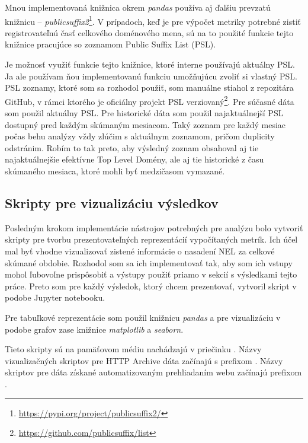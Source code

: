 Mnou implementovaná knižnica  okrem \textit{pandas} používa aj ďalšiu prevzatú knižnicu -- \textit{publicsuffix2}\footnote{\href{https://pypi.org/project/publicsuffix2/}{https://pypi.org/project/publicsuffix2/}}.
V prípadoch, keď je pre výpočet metriky potrebné zistiť registrovateľnú časť celkového doménového mena,
sú na to použité funkcie tejto knižnice pracujúce so zoznamom Public Suffix List (PSL).

Je možnosť využiť funkcie tejto knižnice, ktoré interne používajú aktuálny PSL.
Ja ale používam ňou implementovanú funkciu umožňujúcu zvoliť si vlastný PSL.
PSL zoznamy, ktoré som sa rozhodol použiť, som manuálne stiahol z repozitára GitHub, v rámci ktorého je oficiálny projekt PSL verziovaný\footnote{\href{https://github.com/publicsuffix/list}{https://github.com/publicsuffix/list}}. 
Pre súčasné dáta som použil aktuálny PSL.
Pre historické dáta som použil najaktuálnejší PSL dostupný pred každým skúmaným mesiacom.
Taký zoznam pre každý mesiac počas behu analýzy vždy zlúčim s aktuálnym zoznamom, pričom duplicity odstránim.
Robím to tak preto, aby výsledný zoznam obsahoval aj tie najaktuálnejšie efektívne Top Level Domény, ale aj tie historické z času skúmaného mesiaca, ktoré mohli byť medzičasom vymazané.


\subsection{Skripty pre vizualizáciu výsledkov}

Posledným krokom implementácie nástrojov potrebných pre analýzu bolo vytvoriť skripty pre tvorbu prezentovateľných reprezentácií vypočítaných metrík.
Ich účel mal byť vhodne vizualizovať zistené informácie o nasadení NEL za celkové skúmané obdobie.
Rozhodol som sa ich implementovať tak, aby som ich vstupy mohol ľubovoľne prispôsobiť a výstupy použiť priamo v sekcií s výsledkami tejto práce.
Preto som pre každý výsledok, ktorý chcem prezentovať, vytvoril skript v podobe Jupyter notebooku.

Pre tabuľkové reprezentácie som použil knižnicu \textit{pandas} a pre vizualizáciu v podobe grafov zase knižnice \textit{matplotlib} a \textit{seaborn}.

Tieto skripty sú na pamäťovom médiu nachádzajú v priečinku .
Názvy vizualizačných skriptov pre HTTP Archive dáta začínajú s prefixom .
Názvy skriptov pre dáta získané automatizovaným prehliadaním webu začínajú prefixom .

